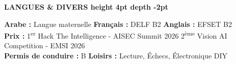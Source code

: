\documentclass[10pt,a4paper]{altacv}
\renewcommand{\cvsection}[2][]{%
  \medskip%
  {\color{heading}\LARGE\bfseries #2 \hspace{0.2em}\leaders\vrule height 4pt depth -2pt\hfill\mbox{}}\par\smallskip
}
\begin{document}
\cvsection{LANGUES \& DIVERS}
\textbf{Arabe :} Langue maternelle \hfill \textbf{Français :} DELF B2 \hfill \textbf{Anglais :} EFSET B2\\[2pt]
\textbf{Prix :} 1\textsuperscript{er} Hack The Intelligence - AISEC Summit 2026 \hfill 2\textsuperscript{ème} Vision AI Competition - EMSI 2026\\[2pt]
\textbf{Permis de conduire :} B \hfill \textbf{Loisirs :} Lecture, Échecs, Électronique DIY
\end{document}
